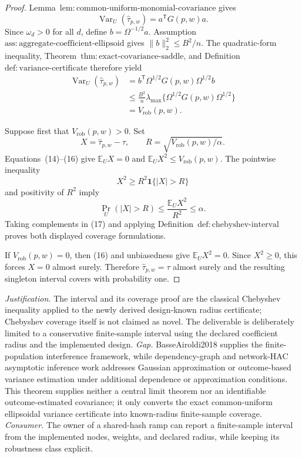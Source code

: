 \documentclass{article}
\begin{document}
\begin{proof}
Lemma~\(\mathrm{lem{:}common\text{-}uniform\text{-}monomial\text{-}covariance}\) gives
\[
\operatorname{Var}_U(\widehat\tau_{p,w})=a^{\mathsf T}G(p,w)a.
\]
Since \(\omega_d>0\) for all \(d\), define \(b=\Omega^{-1/2}a\).  Assumption~\(\mathrm{ass{:}aggregate\text{-}coefficient\text{-}ellipsoid}\) gives \(\lVert b\rVert_2^2\le B^2/n\).  The quadratic-form inequality, Theorem~\(\mathrm{thm{:}exact\text{-}covariance\text{-}saddle}\), and Definition~\(\mathrm{def{:}variance\text{-}certificate}\) therefore yield
\[
\begin{aligned}
\operatorname{Var}_U(\widehat\tau_{p,w})
&=b^{\mathsf T}\Omega^{1/2}G(p,w)\Omega^{1/2}b\\
&\le \frac{B^2}{n}
\lambda_{\max}\{\Omega^{1/2}G(p,w)\Omega^{1/2}\}\\
&=V_{\mathrm{rob}}(p,w).
\end{aligned}
\tag{16}
\]

Suppose first that \(V_{\mathrm{rob}}(p,w)>0\).  Set
\[
X=\widehat\tau_{p,w}-\tau,
\qquad
R=\sqrt{V_{\mathrm{rob}}(p,w)/\alpha}.
\]
Equations~(14)--(16) give \(\mathbb E_UX=0\) and \(\mathbb E_UX^2\le V_{\mathrm{rob}}(p,w)\).  The pointwise inequality
\[
X^2\ge R^2\mathbf1\{|X|>R\}
\]
and positivity of \(R^2\) imply
\[
\Pr_U(|X|>R)
\le\frac{\mathbb E_UX^2}{R^2}
\le\alpha.
\tag{17}
\]
Taking complements in (17) and applying Definition~\(\mathrm{def{:}chebyshev\text{-}interval}\) proves both displayed coverage formulations.

If \(V_{\mathrm{rob}}(p,w)=0\), then (16) and unbiasedness give \(\mathbb E_UX^2=0\).  Since \(X^2\ge0\), this forces \(X=0\) almost surely.  Therefore \(\widehat\tau_{p,w}=\tau\) almost surely and the resulting singleton interval covers with probability one.
\end{proof}
\par\smallskip\noindent \textit{Justification.} The interval and its coverage proof are the classical Chebyshev inequality applied to the newly derived design-known radius certificate; Chebyshev coverage itself is not claimed as novel. The deliverable is deliberately limited to a conservative finite-sample interval using the declared coefficient radius and the implemented design. \textit{Gap.} BasseAiroldi2018 supplies the finite-population interference framework, while dependency-graph and network-HAC asymptotic inference work addresses Gaussian approximation or outcome-based variance estimation under additional dependence or approximation conditions. This theorem supplies neither a central limit theorem nor an identifiable outcome-estimated covariance; it only converts the exact common-uniform ellipsoidal variance certificate into known-radius finite-sample coverage. \textit{Consumer.} The owner of a shared-hash ramp can report a finite-sample interval from the implemented nodes, weights, and declared radius, while keeping its robustness class explicit.
\end{document}
